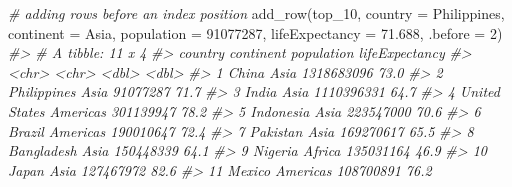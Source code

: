\documentclass[
]{book}
\newenvironment{Shaded}{\begin{snugshade}}{\end{snugshade}}
\newcommand{\AttributeTok}[1]{\textcolor[rgb]{0.77,0.63,0.00}{#1}}
\newcommand{\CommentTok}[1]{\textcolor[rgb]{0.56,0.35,0.01}{\textit{#1}}}
\newcommand{\DecValTok}[1]{\textcolor[rgb]{0.00,0.00,0.81}{#1}}
\newcommand{\FloatTok}[1]{\textcolor[rgb]{0.00,0.00,0.81}{#1}}
\newcommand{\FunctionTok}[1]{\textcolor[rgb]{0.00,0.00,0.00}{#1}}
\newcommand{\NormalTok}[1]{#1}
\newcommand{\StringTok}[1]{\textcolor[rgb]{0.31,0.60,0.02}{#1}}
\begin{document}
\begin{Shaded}
\begin{Highlighting}[]
\CommentTok{\# adding rows before an index position}
\FunctionTok{add\_row}\NormalTok{(top\_10, }
        \AttributeTok{country =} \StringTok{\textquotesingle{}Philippines\textquotesingle{}}\NormalTok{,}
        \AttributeTok{continent =} \StringTok{\textquotesingle{}Asia\textquotesingle{}}\NormalTok{, }
        \AttributeTok{population =} \DecValTok{91077287}\NormalTok{, }
        \AttributeTok{lifeExpectancy =} \FloatTok{71.688}\NormalTok{, }
        \AttributeTok{.before =} \DecValTok{2}\NormalTok{)}
\CommentTok{\#\textgreater{} \# A tibble: 11 x 4}
\CommentTok{\#\textgreater{}    country       continent population lifeExpectancy}
\CommentTok{\#\textgreater{}    \textless{}chr\textgreater{}         \textless{}chr\textgreater{}          \textless{}dbl\textgreater{}          \textless{}dbl\textgreater{}}
\CommentTok{\#\textgreater{}  1 China         Asia      1318683096           73.0}
\CommentTok{\#\textgreater{}  2 Philippines   Asia        91077287           71.7}
\CommentTok{\#\textgreater{}  3 India         Asia      1110396331           64.7}
\CommentTok{\#\textgreater{}  4 United States Americas   301139947           78.2}
\CommentTok{\#\textgreater{}  5 Indonesia     Asia       223547000           70.6}
\CommentTok{\#\textgreater{}  6 Brazil        Americas   190010647           72.4}
\CommentTok{\#\textgreater{}  7 Pakistan      Asia       169270617           65.5}
\CommentTok{\#\textgreater{}  8 Bangladesh    Asia       150448339           64.1}
\CommentTok{\#\textgreater{}  9 Nigeria       Africa     135031164           46.9}
\CommentTok{\#\textgreater{} 10 Japan         Asia       127467972           82.6}
\CommentTok{\#\textgreater{} 11 Mexico        Americas   108700891           76.2}


\end{Highlighting}
\end{Shaded}
\end{document}
